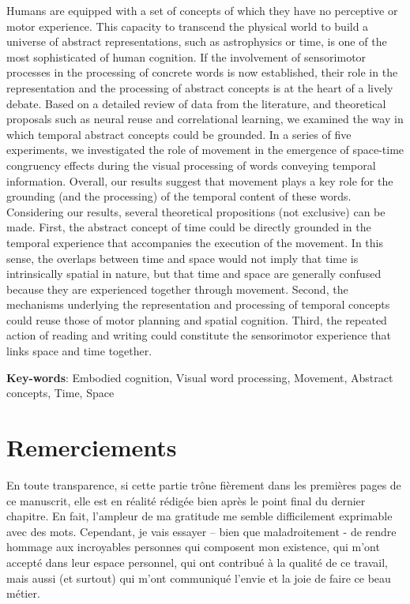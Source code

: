 \documentclass[
  a4paper,12pt,twoside,onecolumn,openright,final,oldfontcommands]{memoir}
\newcommand{\initial}[1]{
	\lettrine[lines=3,lhang=0.33,nindent=0em]{
		\color{gray}
     		{\textsc{#1}}}{}}
\newcommand\blankpage{%
    \null
    \thispagestyle{empty}%
    \newpage
    }
\begin{document}
\initial{H}umans are equipped with a set of concepts of which they have no perceptive or motor experience. This capacity to transcend the physical world to build a universe of abstract representations, such as astrophysics or time, is one of the most sophisticated of human cognition. If the involvement of sensorimotor processes in the processing of concrete words is now established, their role in the representation and the processing of abstract concepts is at the heart of a lively debate. Based on a detailed review of data from the literature, and theoretical proposals such as neural reuse and correlational learning, we examined the way in which temporal abstract concepts could be grounded. In a series of five experiments, we investigated the role of movement in the emergence of space-time congruency effects during the visual processing of words conveying temporal information. Overall, our results suggest that movement plays a key role for the grounding (and the processing) of the temporal content of these words. Considering our results, several theoretical propositions (not exclusive) can be made. First, the abstract concept of time could be directly grounded in the temporal experience that accompanies the execution of the movement. In this sense, the overlaps between time and space would not imply that time is intrinsically spatial in nature, but that time and space are generally confused because they are experienced together through movement. Second, the mechanisms underlying the representation and processing of temporal concepts could reuse those of motor planning and spatial cognition. Third, the repeated action of reading and writing could constitute the sensorimotor experience that links space and time together.

\vspace{\baselineskip}

\textbf{Key-words}: Embodied cognition, Visual word processing, Movement, Abstract concepts, Time, Space

\afterpage{\blankpage}

\chapter*{Remerciements}

\initial{E}n toute transparence, si cette partie trône fièrement dans les premières pages de ce manuscrit, elle est en réalité rédigée bien après le point final du dernier chapitre. En fait, l'ampleur de ma gratitude me semble difficilement exprimable avec des mots. Cependant, je vais essayer -- bien que maladroitement - de rendre hommage aux incroyables personnes qui composent mon existence, qui m'ont accepté dans leur espace personnel, qui ont contribué à la qualité de ce travail, mais aussi (et surtout) qui m'ont communiqué l'envie et la joie de faire ce beau métier.
\end{document}
